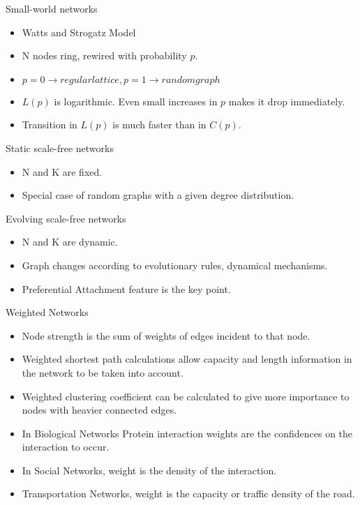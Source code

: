 \documentclass{beamer}
\begin{document}
\begin{frame}{Small-world networks}

\begin{itemize}
 \item Watts and Strogatz Model
 \item N nodes ring, rewired with probability $p$.
 \item $p=0 \rightarrow regular lattice, p=1 \rightarrow random graph$
 \item $L(p)$ is logarithmic. Even small increases in $p$ makes it drop immediately.
 \item Transition in $L(p)$ is much faster than in $C(p)$.
\end{itemize}

\end{frame}

\begin{frame}{Static scale-free networks}

\begin{itemize}
 \item N and K are fixed.
 \item Special case of random graphs with a given degree distribution.
\end{itemize}

\end{frame}

\begin{frame}{Evolving scale-free networks}

\begin{itemize}
 \item N and K are dynamic. 
 \item Graph changes according to evolutionary rules, dynamical mechanisms.
 \item Preferential Attachment feature is the key point.
\end{itemize}

\end{frame}

\begin{frame}{Weighted Networks}
	\begin{itemize}
		\item Node strength is the sum of weights of edges incident to that node.
		\item Weighted shortest path calculations allow capacity and length information in the network to be taken into account.
		\item Weighted clustering coefficient can be calculated to give more importance to nodes with heavier connected edges.
		\item In Biological Networks Protein interaction weights are the confidences on the interaction to occur.
		\item In Social Networks, weight is the density of the interaction.
		\item Transportation Networks, weight is the capacity or traffic density of the road.
	\end{itemize}
\end{frame}
\end{document}
